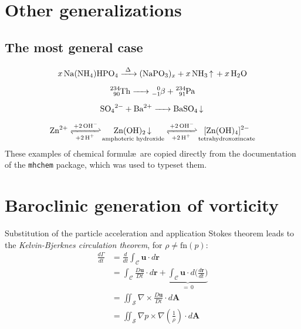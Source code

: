 

\section{Other generalizations}

\subsection{The most general case}

\begin{gather}
\ce{x Na(NH4)HPO4 ->[\Delta] (NaPO3)_x + x NH3 ^ + x H2O} \\[0.5em]
\ce{^234_90Th -> ^0_-1$\beta${} + ^234_91Pa} \\[0.5em]
\ce{SO4^2- + Ba^2+ -> BaSO4 v} \\[0.5em]
\ce{Zn^2+
<=>[+ 2OH-][+ 2H+]
$\underset{\textrm{amphoteric hydroxide}}{\ce{Zn(OH)2 v}}$
<=>[+ 2OH-][+ 2H+]
$\underset{\textrm{tetrahydroxozincate}}{\ce{[Zn(OH)4]^2-}}$
}
\end{gather}
These examples of chemical formul\ae\ are copied directly from the documentation of the \texttt{mhchem} package, which was used to typeset them.

\section{Baroclinic generation of vorticity\label{sec:stratified-flow}}

Substitution of the particle acceleration and application Stokes theorem leads to the \textit{Kelvin-Bjerknes circulation theorem}, for
$\rho \neq \textrm{fn}(p)$:
\begin{align}
\frac{d\Gamma}{dt} &{}= \frac{d}{dt} \int_{\mathcal{C}} \mathbf{u} \cdot d\mathbf{r}\\
				   &{}= \int_{\mathcal{C}} \frac{D\mathbf{u}}{Dt} \cdot d\mathbf{r} + \underbrace{\int_{\mathcal{C}} \mathbf{u}\cdot d\biggl( \frac{d\mathbf{r}}{dt}\biggr)}_{=\, 0} \\[-2pt]
                   &{}= \iint_{\mathcal{S}} \nabla \times \frac{D\mathbf{u}}{Dt}  \cdot d\mathbf{A}\\
                   &{}= \iint_{\mathcal{S}}  \nabla p \times \nabla \left( \frac{1}{\rho}\right) \cdot d\mathbf{A}
\end{align}


